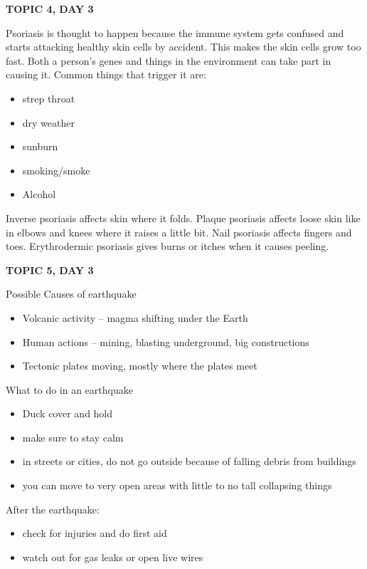 {{{\textbf{TOPIC 4, DAY 3}


Psoriasis is thought to happen because the immune system gets confused and starts attacking healthy skin cells by accident. This makes the skin cells grow too fast. Both a person's genes and things in the environment can take part in causing it.
Common things that trigger it are:
\begin{itemize}
    \item strep throat
    \item dry weather
    \item sunburn
    \item smoking/smoke
    \item Alcohol
\end{itemize}

Inverse psoriasis affects skin where it folds. Plaque psoriasis affects loose skin like in elbows and knees where it raises a little bit. Nail psoriasis affects fingers and toes. Erythrodermic psoriasis gives burns or itches when it causes peeling. 

\textbf{TOPIC 5, DAY 3}

Possible Causes of earthquake

\begin{itemize}
    \item Volcanic activity – magma shifting under the Earth
    \item Human actions – mining, blasting underground, big constructions
    \item Tectonic plates moving, mostly where the plates meet
\end{itemize}


What to do in an earthquake
\begin{itemize}
    \item Duck cover and hold
    \item make sure to stay calm
    \item in streets or cities, do not go outside because of falling debris from buildings
    \item you can move to very open areas with little to no tall collapsing things
\end{itemize}

After the earthquake:
\begin{itemize}
    \item check for injuries and do first aid
    \item watch out for gas leaks or open live wires
\end{itemize}

}}}
